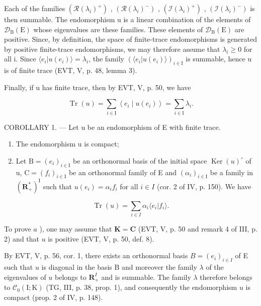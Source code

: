Each of the families \((\mathcal{R}(\lambda_{i})^{+})\) , \((\mathcal{R}(\lambda_{i})^{-})\) , \((\mathcal{I}(\lambda_{i})^{+})\) , \((\mathcal{I}(\lambda_{i})^{-})\) is then summable. The endomorphism u is a linear combination of the elements of \(\mathcal{D}_{\mathrm{B}}(\mathrm{E})\) whose eigenvalues are these families. These elements of \(\mathcal{D}_{\mathrm{B}}(\mathrm{E})\) are positive. Since, by definition, the space of finite-trace endomorphisms is generated by positive finite-trace endomorphisms, we may therefore assume that \(\lambda_{i} \geqslant 0\) for all i. Since \(\langle e_{i} | u(e_{i}) \rangle = \lambda_{i}\), the family \((\langle e_{i} | u(e_{i}) \rangle)_{i \in \mathrm{I}}\) is summable, hence u is of finite trace (EVT, V, p. 48, lemma 3).

Finally, if u has finite trace, then by EVT, V, p. 50, we have

\[
\operatorname{Tr} (u) = \sum_ {i \in \mathrm{I}} \left\langle e _ {i} \mid u \left(e _ {i}\right) \right\rangle = \sum_ {i \in \mathrm{I}} \lambda_ {i}.
\]

COROLLARY 1. --- Let u be an endomorphism of E with finite trace.

\begin{enumerate}
\def\labelenumi{\alph{enumi})}
\item
  The endomorphism u is compact;
\item
  Let \(\mathrm{B} = (e_i)_{i \in \mathrm{I}}\) be an orthonormal basis of the initial space \(\operatorname{Ker}(u)^{\circ}\) of u, \(\mathrm{C} = (f_i)_{i \in \mathrm{I}}\) be an orthonormal family of E and \((\alpha_i)_{i \in \mathrm{I}}\) be a family in \((\mathbf{R}_+^*)^{\mathrm{I}}\) such that \(u(e_i) = \alpha_i f_i\) for all \(i \in I\) (cor. 2 of IV, p. 150). We have
\end{enumerate}

\[
\operatorname{Tr} (u) = \sum_ {i \in I} \alpha_ {i} \langle e _ {i} | f _ {i} \rangle .
\]

To prove \(a\) ), one may assume that \(\mathbf{K} = \mathbf{C}\) (EVT, V, p. 50 and remark 4 of III, p. 2) and that \(u\) is positive (EVT, V, p. 50, def. 8).

By EVT, V, p. 56, cor. 1, there exists an orthonormal basis \(B = (e_i)_{i \in I}\) of E such that \(u\) is diagonal in the basis B and moreover the family \(\lambda\) of the eigenvalues of \(u\) belongs to \(\mathbf{R}_+^I\) and is summable. The family \(\lambda\) therefore belongs to \(\mathcal{C}_0(\mathrm{I};\mathrm{K})\) (TG, III, p. 38, prop. 1), and consequently the endomorphism \(u\) is compact (prop. 2 of IV, p. 148).

